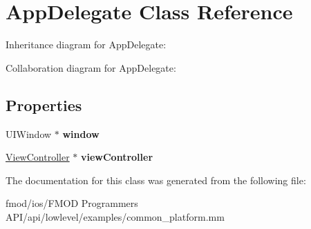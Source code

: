 \hypertarget{interface_app_delegate}{\section{App\+Delegate Class Reference}
\label{interface_app_delegate}
}


Inheritance diagram for App\+Delegate\+:


Collaboration diagram for App\+Delegate\+:
\subsection*{Properties}
\begin{DoxyCompactItemize}
\item 
\hypertarget{interface_app_delegate_aa0fc288e3f50a2f5ff4cbb597ca0c5ef}{U\+I\+Window $\ast$ {\bfseries window}}\label{interface_app_delegate_aa0fc288e3f50a2f5ff4cbb597ca0c5ef}

\item 
\hypertarget{interface_app_delegate_a56bf069d4d46a86d303252942860e6f5}{\hyperlink{interface_view_controller}{View\+Controller} $\ast$ {\bfseries view\+Controller}}\label{interface_app_delegate_a56bf069d4d46a86d303252942860e6f5}

\end{DoxyCompactItemize}


The documentation for this class was generated from the following file\+:\begin{DoxyCompactItemize}
\item 
fmod/ios/\+F\+M\+O\+D Programmers A\+P\+I/api/lowlevel/examples/common\+\_\+platform.\+mm\end{DoxyCompactItemize}

